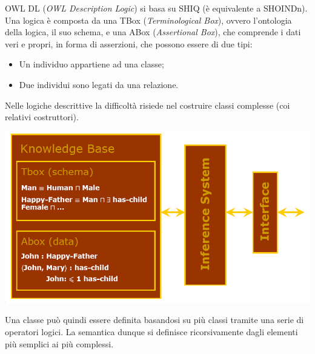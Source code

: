 \documentclass[11pt]{article}
\begin{document}
OWL DL (\textit{OWL Description Logic}) si basa su SHIQ (è equivalente a SHOINDn).
Una logica è composta da una TBox (\textit{Terminological Box}), ovvero l'ontologia della logica, il suo schema, e una ABox (\textit{Assertional Box}), che comprende i dati veri e propri, in forma di asserzioni, che possono essere di due tipi:
\begin{itemize}
\item Un individuo appartiene ad una classe;
\item Due individui sono legati da una relazione.
\end{itemize}
Nelle logiche descrittive la difficoltà risiede nel costruire classi complesse (coi relativi costruttori). \newline
\begin{center}
	\includegraphics[scale=0.6]{IMG1.png}
\end{center}
Una classe può quindi essere definita basandosi su più classi tramite una serie di operatori logici.
La semantica dunque si definisce ricorsivamente dagli elementi più semplici ai più complessi.
\end{document}

